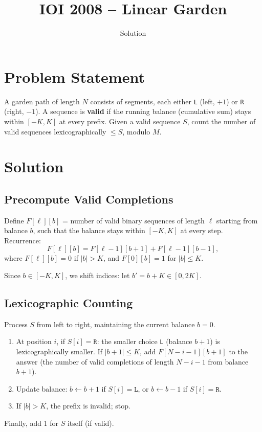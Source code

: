 \documentclass[11pt,a4paper]{article}
\title{IOI 2008 -- Linear Garden}
\author{Solution}
\date{}
\begin{document}
\maketitle

\section{Problem Statement}
A garden path of length $N$ consists of segments, each either \texttt{L} (left, $+1$) or \texttt{R} (right, $-1$). A sequence is \textbf{valid} if the running balance (cumulative sum) stays within $[-K, K]$ at every prefix. Given a valid sequence $S$, count the number of valid sequences lexicographically $\le S$, modulo $M$.

\section{Solution}

\subsection{Precompute Valid Completions}
Define $F[\ell][b]$ = number of valid binary sequences of length $\ell$ starting from balance $b$, such that the balance stays within $[-K, K]$ at every step. Recurrence:
\[
F[\ell][b] = F[\ell-1][b+1] + F[\ell-1][b-1],
\]
where $F[\ell][b] = 0$ if $|b| > K$, and $F[0][b] = 1$ for $|b| \le K$.

Since $b \in [-K, K]$, we shift indices: let $b' = b + K \in [0, 2K]$.

\subsection{Lexicographic Counting}
Process $S$ from left to right, maintaining the current balance $b = 0$.
\begin{enumerate}
    \item At position $i$, if $S[i] = \texttt{R}$: the smaller choice \texttt{L} (balance $b+1$) is lexicographically smaller. If $|b+1| \le K$, add $F[N-i-1][b+1]$ to the answer (the number of valid completions of length $N-i-1$ from balance $b+1$).
    \item Update balance: $b \gets b + 1$ if $S[i] = \texttt{L}$, or $b \gets b - 1$ if $S[i] = \texttt{R}$.
    \item If $|b| > K$, the prefix is invalid; stop.
\end{enumerate}
Finally, add 1 for $S$ itself (if valid).
\end{document}
